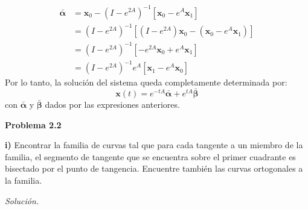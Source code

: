 \documentclass[12pt,letterpaper]{article}
\begin{document}
\begin{align*}
  \boldsymbol{\bar{\alpha}} &= \mathbf{x}_0 - (I - e^{2A})^{-1} [ \mathbf{x}_0 - e^A \mathbf{x}_1 ] \\
  &= (I - e^{2A})^{-1} [ (I - e^{2A}) \mathbf{x}_0 - (\mathbf{x}_0 - e^A \mathbf{x}_1) ] \\
  &= (I - e^{2A})^{-1} [ -e^{2A} \mathbf{x}_0 + e^A \mathbf{x}_1 ] \\
  &= (I - e^{2A})^{-1} e^A [ \mathbf{x}_1 - e^A \mathbf{x}_0 ]
\end{align*}
Por lo tanto, la solución del sistema queda completamente determinada por:
\[
  \mathbf{x}(t) = e^{-tA} \boldsymbol{\bar{\alpha}} + e^{tA} \boldsymbol{\bar{\beta}}
\]
con $\boldsymbol{\bar{\alpha}}$ y $\boldsymbol{\bar{\beta}}$ dados por las expresiones anteriores.

\bigskip

\textbf{Problema 2.2}

\medskip
\textbf{i)} Encontrar la familia de curvas tal que para cada tangente a un miembro de la familia, el segmento de tangente que se encuentra sobre el primer cuadrante es bisectado por el punto de tangencia. Encuentre también las curvas ortogonales a la familia.

\medskip
\textit{Solución.}
\end{document}
